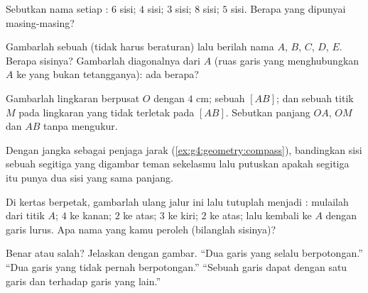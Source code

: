 \begin{exercise}[$\star$]\label{exo:g4:geometry:3}
Sebutkan nama setiap : $6$ sisi; $4$ sisi; $3$ sisi; $8$
sisi; $5$ sisi. Berapa \emph{} yang dipunyai masing-masing?
\end{exercise}

\begin{exercise}[$\star$]\label{exo:g4:geometry:4}
Gambarlah sebuah  (tidak harus beraturan) lalu berilah nama
 $A$, $B$, $C$, $D$, $E$. Berapa sisinya? Gambarlah
diagonalnya dari $A$ (ruas garis yang menghubungkan $A$ ke  yang bukan tetangganya): ada berapa?
\end{exercise}

\begin{exercise}[$\star$]\label{exo:g4:geometry:5}
Gambarlah lingkaran berpusat $O$ dengan  $4$ cm; sebuah
 $[AB]$; dan sebuah titik $M$ pada lingkaran yang tidak
terletak pada $[AB]$. Sebutkan panjang $OA$, $OM$ dan $AB$ tanpa mengukur.
\end{exercise}

\begin{exercise}[$\star$]\label{exo:g4:geometry:6}
Dengan jangka sebagai penjaga jarak
(\cref{ex:g4:geometry:compass}), bandingkan sisi sebuah segitiga
yang digambar teman sekelasmu lalu putuskan apakah segitiga itu punya dua sisi yang sama panjang.
\end{exercise}

\begin{exercise}[$\star$]\label{exo:g4:geometry:7}
Di kertas berpetak, gambarlah ulang jalur ini lalu tutuplah menjadi
: mulailah dari titik $A$; $4$ ke kanan; $2$ ke atas; $3$
ke kiri; $2$ ke atas; lalu kembali ke $A$ dengan garis lurus. Apa
nama  yang kamu peroleh (bilanglah sisinya)?
\end{exercise}

\begin{exercise}[$\star$]\label{exo:g4:geometry:8}
Benar atau salah? Jelaskan dengan gambar.
``Dua garis yang  selalu berpotongan.''
``Dua garis yang  tidak pernah berpotongan.''
``Sebuah garis dapat  dengan satu garis dan 
terhadap garis yang lain.''
\end{exercise}

